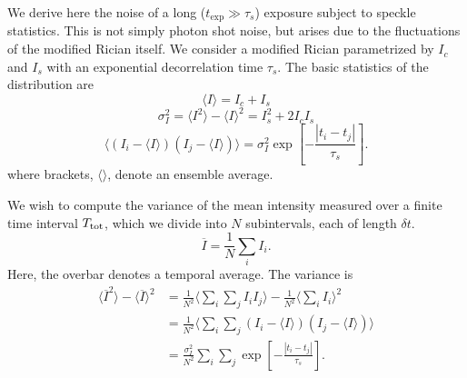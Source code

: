 \documentclass[../main.tex]{subfiles}
\begin{document}
\renewcommand{\theequation}{A\arabic{equation}}

We derive here the noise of a long ($t_\mathrm{exp} \gg \tau_s$) exposure subject to speckle statistics.  This is not simply photon shot noise, but arises due to the fluctuations of the modified Rician itself.  We consider a modified Rician parametrized by $I_c$ and $I_s$ with an exponential decorrelation time $\tau_s$.  The basic statistics of the distribution are
\begin{equation}
    \langle I \rangle = I_c + I_s
\end{equation}
\begin{equation}
    \sigma^2_I = \langle I^2 \rangle - \langle I \rangle^2 = I_s^2 + 2 I_c I_s
\end{equation}
\begin{equation}
    \langle (I_i - \langle I \rangle) (I_j - \langle I \rangle)  \rangle = \sigma^2_I \exp \left[ -\frac{|t_i - t_j|}{\tau_s} \right] .
\end{equation}
where brackets, $\langle \rangle$, denote an ensemble average.

We wish to compute the variance of the mean intensity measured over a finite time interval $T_{\rm tot}$, which we divide into $N$ subintervals, each of length $\delta t$.
\begin{equation}
    \overline{I} = \frac{1}{N} \sum_i I_i .
\end{equation}
Here, the overbar denotes a temporal average. The variance is 
\begin{align}
    \langle \overline{I}^2 \rangle - \langle \overline{I} \rangle^2 &= \frac{1}{N^2} \bigg \langle \sum_i \sum_j I_i I_j \bigg \rangle - \frac{1}{N^2} \bigg \langle \sum_i I_i \bigg \rangle^2 \\
    &= \frac{1}{N^2} \bigg \langle \sum_i \sum_j \left( I_i - \langle I \rangle \right) \left( I_j - \langle I \rangle \right) \bigg \rangle \\
    &= \frac{\sigma^2_I}{N^2} \sum_i \sum_j \exp \left[ - \frac{|t_i - t_j|}{\tau_s} \right].
\end{align}
\end{document}
